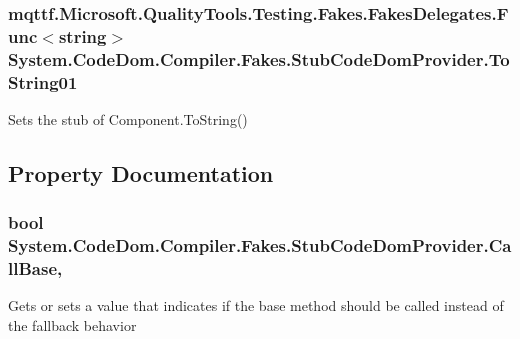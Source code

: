 \hypertarget{class_system_1_1_code_dom_1_1_compiler_1_1_fakes_1_1_stub_code_dom_provider_adbe7ab04180a1278791fa1371e7a61e1}{
\subsubsection[{To\-String01}]{\setlength{\rightskip}{0pt plus 5cm}mqttf.\-Microsoft.\-Quality\-Tools.\-Testing.\-Fakes.\-Fakes\-Delegates.\-Func$<$string$>$ System.\-Code\-Dom.\-Compiler.\-Fakes.\-Stub\-Code\-Dom\-Provider.\-To\-String01}}\label{class_system_1_1_code_dom_1_1_compiler_1_1_fakes_1_1_stub_code_dom_provider_adbe7ab04180a1278791fa1371e7a61e1}


Sets the stub of Component.\-To\-String()



\subsection{Property Documentation}
\hypertarget{class_system_1_1_code_dom_1_1_compiler_1_1_fakes_1_1_stub_code_dom_provider_ab7d1ecc9051761901854e225181d633c}{
\subsubsection[{Call\-Base}]{\setlength{\rightskip}{0pt plus 5cm}bool System.\-Code\-Dom.\-Compiler.\-Fakes.\-Stub\-Code\-Dom\-Provider.\-Call\-Base\hspace{0.3cm}{\ttfamily [get]}, {\ttfamily [set]}}}\label{class_system_1_1_code_dom_1_1_compiler_1_1_fakes_1_1_stub_code_dom_provider_ab7d1ecc9051761901854e225181d633c}


Gets or sets a value that indicates if the base method should be called instead of the fallback behavior

